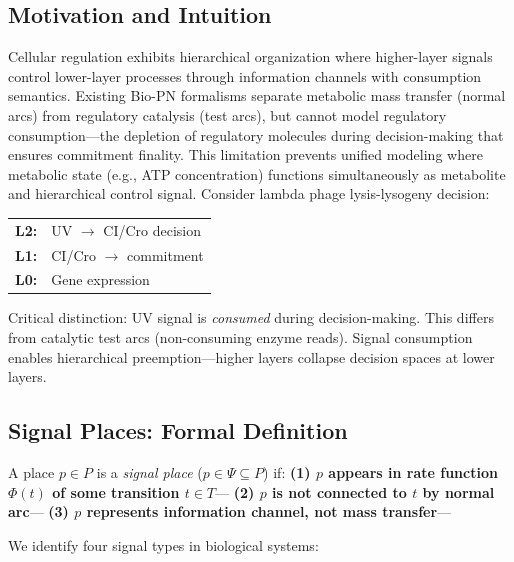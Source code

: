 
\subsection{Motivation and Intuition}

Cellular regulation exhibits hierarchical organization where higher-layer signals control lower-layer processes through information channels with consumption semantics. Existing Bio-PN formalisms separate metabolic mass transfer (normal arcs) from regulatory catalysis (test arcs), but cannot model regulatory consumption---the depletion of regulatory molecules during decision-making that ensures commitment finality. This limitation prevents unified modeling where metabolic state (e.g., ATP concentration) functions simultaneously as metabolite and hierarchical control signal. Consider lambda phage lysis-lysogeny decision:

\begin{center}
\small
\begin{tabular}{@{}ll@{}}
\textbf{L2:} & UV $\to$ CI/Cro decision \\
\textbf{L1:} & CI/Cro $\to$ commitment \\
\textbf{L0:} & Gene expression
\end{tabular}
\end{center}

\vspace{3pt}
\noindent Critical distinction: UV signal is \textit{consumed} during decision-making. This differs from catalytic test arcs (non-consuming enzyme reads). Signal consumption enables hierarchical preemption---higher layers collapse decision spaces at lower layers.

\subsection{Signal Places: Formal Definition}

\begin{definition}
A place $p \in P$ is a \textit{signal place} ($p \in \Psi \subseteq P$) if:
\textbf{(1) $p$ appears in rate function $\Phi(t)$ of some transition $t \in T$}--- \textbf{(2) $p$ is \textbf{not} connected to $t$ by normal arc}--- \textbf{(3) $p$ represents information channel, not mass transfer}---
\end{definition}

\vspace{3pt}
\noindent We identify four signal types in biological systems:

